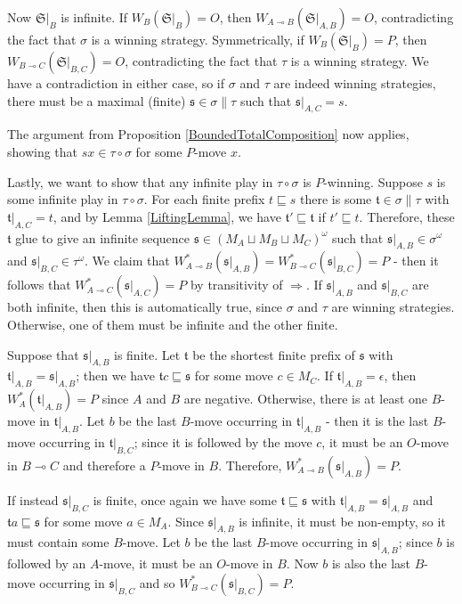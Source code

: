 \documentclass[11pt]{article} %
\theoremstyle{plain} %
\theoremstyle{definition} %
\theoremstyle{note}
\theoremstyle{exercisestyle}
\renewcommand{\implies}{\multimap}
\newcommand{\comp}[2]{#1 \circ #2}
\newcommand{\cprd}{\sqcup}
\newcommand{\s}{\mathfrak s}
\renewcommand{\t}{\mathfrak t}
\newcommand{\emptyplay}{\epsilon}
\newcommand{\prefix}{\sqsubseteq}
\renewcommand{\S}{{\mathfrak{S}}}
\begin{document}
Now $\S\vert_B$ is infinite.  If $W_B(\S\vert_B)=O$, then $W_{A\implies B}(\S\vert_{A,B})=O$, contradicting the fact that $\sigma$ is a winning strategy.  Symmetrically, if $W_B(\S\vert_B)=P$, then $W_{B\implies C}(\S\vert_{B,C})=O$, contradicting the fact that $\tau$ is a winning strategy.  We have a contradiction in either case, so if $\sigma$ and $\tau$ are indeed winning strategies, there must be a maximal (finite) $\s\in\sigma\|\tau$ such that $\s\vert_{A,C}=s$.  

The argument from Proposition \ref{BoundedTotalComposition} now applies, showing that $sx\in\comp\tau\sigma$ for some $P$-move $x$.  

Lastly, we want to show that any infinite play in $\comp\tau\sigma$ is $P$-winning.  Suppose $s$ is some infinite play in $\comp\tau\sigma$.  For each finite prefix $t\prefix s$ there is some $\t\in\sigma\|\tau$ with $\t\vert_{A,C}=t$, and by Lemma \ref{LiftingLemma}, we have $\t'\prefix\t$ if $t'\prefix t$.  Therefore, these $\t$ glue to give an infinite sequence $\s\in(M_A\cprd M_B\cprd M_C)^\omega$ such that $\s\vert_{A,B}\in\sigma^\omega$ and $\s\vert_{B,C}\in\tau^\omega$.  We claim that $W_{A\implies B}^*(\s\vert_{A,B})=W_{B\implies C}^*(\s\vert_{B,C})=P$ - then it follows that $W_{A\implies C}^*(\s\vert_{A,C})=P$ by transitivity of $\Rightarrow$.  If $\s\vert_{A,B}$ and $\s\vert_{B,C}$ are both infinite, then this is automatically true, since $\sigma$ and $\tau$ are winning strategies.  Otherwise, one of them must be infinite and the other finite.  

Suppose that $\s\vert_{A,B}$ is finite.  Let $\t$ be the shortest finite prefix of $\s$ with $\t\vert_{A,B}=\s\vert_{A,B}$; then we have $\t c\prefix \s$ for some move $c\in M_C$.  If $\t\vert_{A,B}=\emptyplay$, then $W_A^*(\t\vert_{A,B})=P$ since $A$ and $B$ are negative.  Otherwise, there is at least one $B$-move in $\t\vert_{A,B}$.  Let $b$ be the last $B$-move occurring in $\t\vert_{A,B}$ - then it is the last $B$-move occurring in $\t\vert_{B,C}$; since it is followed by the move $c$, it must be an $O$-move in $B\implies C$ and therefore a $P$-move in $B$.  Therefore, $W_{A\implies B}^*(\s\vert_{A,B})=P$.  

If instead $\s\vert_{B,C}$ is finite, once again we have some $\t\prefix\s$ with $\t\vert_{A,B}=\s\vert_{A,B}$ and $\t a\prefix\s$ for some move $a\in M_A$.  Since $\s\vert_{A,B}$ is infinite, it must be non-empty, so it must contain some $B$-move.  Let $b$ be the last $B$-move occurring in $\s\vert_{A,B}$; since $b$ is followed by an $A$-move, it must be an $O$-move in $B$.  Now $b$ is also the last $B$-move occurring in $\s\vert_{B,C}$ and so $W_{B\implies C}^*(\s\vert_{B,C})=P$.
\end{document}
